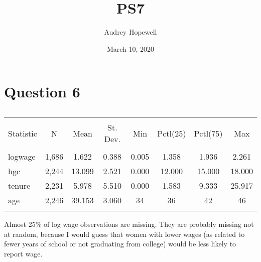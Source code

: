 \documentclass{article}
\title{PS7}
\author{Audrey Hopewell }
\date{March 10, 2020}
\begin{document}
\maketitle

\section{Question 6}
\begin{table}[!htbp] \centering 
  \caption{} 
  \label{} 
\begin{tabular}{@{\extracolsep{5pt}}lccccccc} 
\\[-1.8ex]\hline 
\hline \\[-1.8ex] 
Statistic & \multicolumn{1}{c}{N} & \multicolumn{1}{c}{Mean} & \multicolumn{1}{c}{St. Dev.} & \multicolumn{1}{c}{Min} & \multicolumn{1}{c}{Pctl(25)} & \multicolumn{1}{c}{Pctl(75)} & \multicolumn{1}{c}{Max} \\ 
\hline \\[-1.8ex] 
logwage & 1,686 & 1.622 & 0.388 & 0.005 & 1.358 & 1.936 & 2.261 \\ 
hgc & 2,244 & 13.099 & 2.521 & 0.000 & 12.000 & 15.000 & 18.000 \\ 
tenure & 2,231 & 5.978 & 5.510 & 0.000 & 1.583 & 9.333 & 25.917 \\ 
age & 2,246 & 39.153 & 3.060 & 34 & 36 & 42 & 46 \\ 
\hline \\[-1.8ex] 
\end{tabular} 
\end{table} 

Almost 25\% of log wage observations are missing. They are probably missing not at random, because I would guess that women with lower wages (as related to fewer years of school or not graduating from college) would be less likely to report wage.

\newpage
\end{document}
